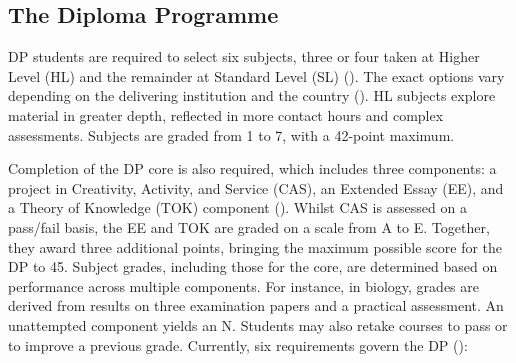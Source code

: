 \documentclass[12pt]{article}
\begin{document}
\subsection{The Diploma Programme}

DP students are required to select six subjects, three or four taken at Higher Level (HL) and the remainder at Standard Level (SL) (\cite{tayMovementInternationalEducation2023}).
The exact options vary depending on the delivering institution and the country (\cite{maireIBDiplomaGlobalisation2021}). HL subjects explore material in greater depth, reflected in more contact hours and complex assessments. Subjects are graded from 1 to 7, with a 42-point maximum.

Completion of the DP core is also required, which includes three components: a project in Creativity, Activity, and Service (CAS), an Extended Essay (EE), and a Theory of Knowledge (TOK) component (\cite{tayMovementInternationalEducation2023}). Whilst CAS is assessed on a pass/fail basis, the EE and TOK are graded on a scale from A to E. Together, they award three additional points, bringing the maximum possible score for the DP to 45. Subject grades, including those for the core, are determined based on performance across multiple components. For instance, in biology, grades are derived from results on three examination papers and a practical assessment. An unattempted component yields an N. Students may also retake courses to pass or to improve a previous grade. Currently, six requirements govern the DP (\cite{DPPassingCriteria2023}):

\end{document}
